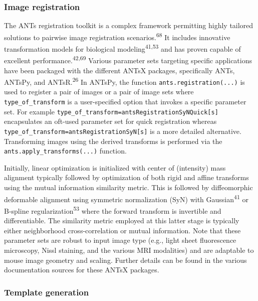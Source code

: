 \documentclass[
  12pt,
]{article}
\begin{document}
\hypertarget{image-registration}{%
\subsubsection{Image registration}\label{image-registration}}

The ANTs registration toolkit is a complex framework permitting highly
tailored solutions to pairwise image registration
scenarios.\textsuperscript{68} It includes innovative transformation
models for biological modeling\textsuperscript{41,53} and has proven
capable of excellent performance.\textsuperscript{42,69} Various
parameter sets targeting specific applications have been packaged with
the different ANTsX packages, specifically ANTs, ANTsPy, and
ANTsR.\textsuperscript{26} In ANTsPy, the function
\texttt{ants.registration(...)} is used to register a pair of images or
a pair of image sets where \texttt{type\_of\_transform} is a
user-specified option that invokes a specific parameter set. For example
\texttt{type\_of\_transform=\textquotesingle{}antsRegistrationSyNQuick{[}s{]}\textquotesingle{}}
encapsulates an oft-used parameter set for quick registration whereas
\texttt{type\_of\_transform=\textquotesingle{}antsRegistrationSyN{[}s{]}\textquotesingle{}}
is a more detailed alternative. Transforming images using the derived
transforms is performed via the \texttt{ants.apply\_transforms(...)}
function.

Initially, linear optimization is initialized with center of (intensity)
mass alignment typically followed by optimization of both rigid and
affine transforms using the mutual information similarity metric. This
is followed by diffeomorphic deformable alignment using symmetric
normalization (SyN) with Gaussian\textsuperscript{41} or B-spline
regularization\textsuperscript{53} where the forward transform is
invertible and differentiable. The similarity metric employed at this
latter stage is typically either neighborhood cross-correlation or
mutual information. Note that these parameter sets are robust to input
image type (e.g., light sheet fluorescence microscopy, Nissl staining,
and the various MRI modalities) and are adaptable to mouse image
geometry and scaling. Further details can be found in the various
documentation sources for these ANTsX packages.

\hypertarget{template-generation}{%
\subsubsection{Template generation}\label{template-generation}}
\end{document}
